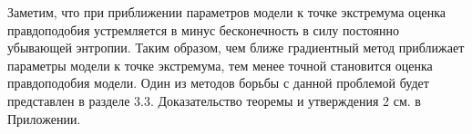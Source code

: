 Заметим, что при приближении параметров модели к точке экстремума оценка правдоподобия устремляется в минус бесконечность в силу постоянно убывающей энтропии. Таким образом, чем ближе градиентный метод приближает параметры модели к точке экстремума, тем менее точной становится оценка правдоподобия модели. Один из методов борьбы с данной проблемой будет представлен в разделе 3.3.
Доказательство теоремы и утверждения 2 см. в Приложении.

	


 

